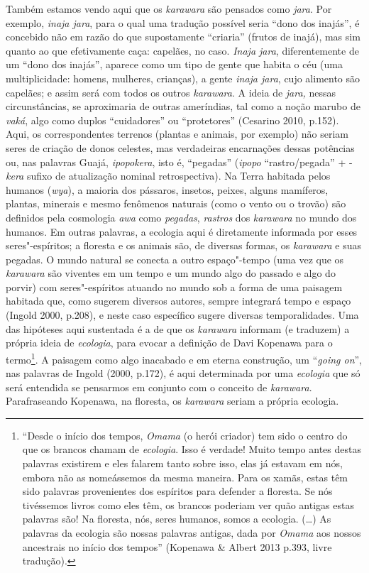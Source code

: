 Também estamos vendo aqui que os \emph{karawara} são pensados como
\emph{jara}. Por exemplo, \emph{inaja jara}, para o qual uma tradução
possível seria ``dono dos inajás'', é concebido não em razão do que
supostamente ``criaria'' (frutos de inajá), mas sim quanto ao que
efetivamente caça: capelães, no caso. \emph{Inaja jara}, diferentemente
de um ``dono dos inajás'', aparece como um tipo de gente que habita o céu
(uma multiplicidade: homens, mulheres, crianças), a gente \emph{inaja
jara}, cujo alimento são capelães; e assim será com todos os outros
\emph{karawara}. A ideia de \emph{jara,} nessas circunstâncias, se
aproximaria de outras ameríndias, tal como a noção marubo de
\emph{vaká}, algo como duplos ``cuidadores'' ou ``protetores'' (Cesarino
2010, p.152). Aqui, os correspondentes terrenos (plantas e animais, por
exemplo) não seriam seres de criação de donos celestes, mas verdadeiras
encarnações dessas potências ou, nas palavras Guajá, \emph{ipopokera},
isto é, ``pegadas'' (\emph{ipopo} ``rastro/pegada'' + -\emph{kera}
sufixo de atualização nominal retrospectiva). Na Terra habitada pelos
humanos (\emph{wya}), a maioria dos pássaros, insetos, peixes, alguns
mamíferos, plantas, minerais e mesmo fenômenos naturais (como o vento ou
o trovão) são definidos pela cosmologia \emph{awa} como \emph{pegadas},
\emph{rastros} dos \emph{karawara} no mundo dos humanos. Em outras
palavras, a ecologia aqui é diretamente informada por esses
seres"-espíritos; a floresta e os animais são, de diversas formas, os
\emph{karawara} e suas pegadas. O mundo natural se conecta a outro
espaço"-tempo (uma vez que os \emph{karawara} são viventes em um tempo e
um mundo algo do passado e algo do porvir) com seres"-espíritos atuando
no mundo sob a forma de uma paisagem habitada que, como sugerem diversos
autores, sempre integrará tempo e espaço (Ingold 2000, p.208), e neste
caso específico sugere diversas temporalidades. Uma das hipóteses aqui
sustentada é a de que os \emph{karawara} informam (e traduzem) a própria
ideia de \emph{ecologia}, para evocar a definição de Davi Kopenawa para
o termo\footnote{``Desde o início dos tempos, \emph{Omama} (o herói
  criador) tem sido o centro do que os brancos chamam de
  \emph{ecologia}. Isso é verdade! Muito tempo antes destas palavras
  existirem e eles falarem tanto sobre isso, elas já estavam em nós,
  embora não as nomeássemos da mesma maneira. Para os xamãs, estas têm
  sido palavras provenientes dos espíritos para defender a floresta. Se
  nós tivéssemos livros como eles têm, os brancos poderiam ver quão
  antigas estas palavras são! Na floresta, nós, seres humanos, somos a
  ecologia. (\ldots{}) As palavras da ecologia são nossas palavras antigas,
  dada por \emph{Omama} aos nossos ancestrais no início dos tempos''
  (Kopenawa \& Albert 2013 p.393, livre tradução).}. A paisagem como
algo inacabado e em eterna construção, um ``\emph{going on}'', nas
palavras de Ingold (2000, p.172), é aqui determinada por uma
\emph{ecologia} que só será entendida se pensarmos em conjunto com o
conceito de \emph{karawara}. Parafraseando Kopenawa, na floresta, os
\emph{karawara} seriam a própria ecologia.

